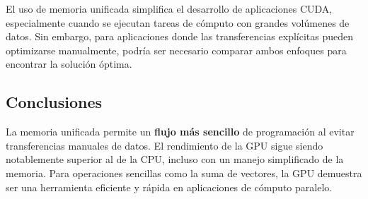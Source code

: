 \documentclass[twocolumn,a4paper,12pt]{article}
\begin{document}
El uso de memoria unificada simplifica el desarrollo de aplicaciones CUDA, especialmente cuando se ejecutan tareas de cómputo con grandes volúmenes de datos. Sin embargo, para aplicaciones donde las transferencias explícitas pueden optimizarse manualmente, podría ser necesario comparar ambos enfoques para encontrar la solución óptima.

\subsection{Conclusiones}

La memoria unificada permite un \textbf{flujo más sencillo} de programación al evitar transferencias manuales de datos. El rendimiento de la GPU sigue siendo notablemente superior al de la CPU, incluso con un manejo simplificado de la memoria. Para operaciones sencillas como la suma de vectores, la GPU demuestra ser una herramienta eficiente y rápida en aplicaciones de cómputo paralelo.
\end{document}
